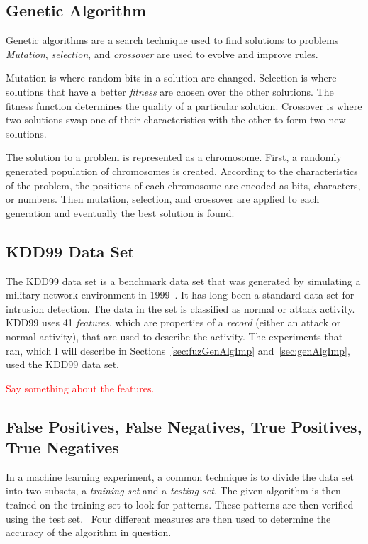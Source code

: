 \documentclass{sig-alternate}
\newcommand{\mycomment}[1]{\textcolor{red}{#1}}
\begin{document}
\subsection{Genetic Algorithm}
Genetic algorithms are a search technique used to find solutions to problems \emph{Mutation}, \emph{selection}, and \emph{crossover} are used to evolve and improve rules.

Mutation is where random bits in a solution are changed. Selection is where solutions that have a better \emph{fitness} are chosen over the other solutions. The fitness function determines the quality of a particular solution. Crossover is where two solutions swap one of their characteristics with the other to form two new solutions.

The solution to a problem is represented as a chromosome. First, a randomly generated population of chromosomes is created. According to the characteristics of the problem, the positions of each chromosome are encoded as bits, characters, or numbers. Then mutation, selection, and crossover are applied to each generation and eventually the best solution is found.~\cite{DBLP:journals/corr/abs-1204-6416}




\subsection{KDD99 Data Set}
The KDD99 data set is a benchmark data set that was generated by simulating a military network environment in 1999~\cite{6559603}. It has long been a standard data set for intrusion detection. The data in the set is classified as normal or attack activity. KDD99 uses 41 \emph{features}, which are properties of a \emph{record} (either an attack or normal activity), that are used to describe the activity. The experiments that~\cite{6559603, DBLP:journals/corr/abs-1204-1336} ran, which I will describe in Sections~\ref{sec:fuzGenAlgImp} and~\ref{sec:genAlgImp}, used the KDD99 data set.

\mycomment{Say something about the features.}




\subsection{False Positives, False Negatives, True Positives, True Negatives}
\label{sec:PosNeg}
In a machine learning experiment, a common technique is to divide the data set into two subsets, a \emph{training set} and a \emph{testing set}. The given algorithm is then trained on the training set to look for patterns. These patterns are then verified using the test set.~\cite{bc1_ecindm} Four different measures are then used to determine the accuracy of the algorithm in question.
\end{document}
